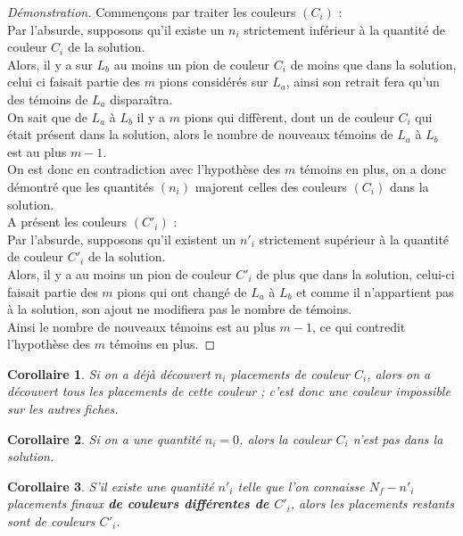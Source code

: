 \documentclass[]{article}
\newtheorem{mycoro}{Corollaire}
\begin{document}
\begin{proof}[Démonstration]
	Commençons par traiter les couleurs $(C_i)$ :
	\\
	Par l'absurde, supposons qu'il existe un $n_i$ strictement inférieur à la quantité de couleur $C_i$ de la solution.
	\\
	Alors, il y a sur $L_b$ au moins un pion de couleur $C_i$ de moins que dans la solution, celui ci faisait partie des $m$ pions considérés sur $L_a$, ainsi son retrait fera qu'un des témoins de $L_a$ disparaîtra.
	\\
	On sait que de $L_a$ à $L_b$ il y a $m$ pions qui diffèrent, dont un de couleur $C_i$ qui était présent dans la solution, alors le nombre de nouveaux témoins de $L_a$ à $L_b$ est au plus $m - 1$.
	\\
	On est donc en contradiction avec l'hypothèse des $m$ témoins en plus, on a donc démontré que les quantités $(n_i)$ majorent celles des couleurs $(C_i)$ dans la solution.
	\\
	A présent les couleurs $(C'_i)$ :
	\\
	Par l'absurde, supposons qu'il existent un $n'_i$ strictement supérieur à la quantité de couleur $C'_i$ de la solution.
	\\
	Alors, il y a au moins un pion de couleur $C'_i$ de plus que dans la solution, celui-ci faisait partie des $m$ pions qui ont changé de $L_a$ à $L_b$ et comme il n'appartient pas à la solution, son ajout ne modifiera pas le nombre de témoins.
	\\
	Ainsi le nombre de nouveaux témoins est au plus $m-1$, ce qui contredit l'hypothèse des $m$ témoins en plus.
\end{proof}

\begin{mycoro}
Si on a déjà découvert $n_i$ placements de couleur $C_i$, alors on a découvert tous les placements de cette couleur ; c'est donc une couleur impossible sur les autres fiches.
\end{mycoro}

\begin{mycoro}
Si on a une quantité $n_i=0$, alors la couleur $C_i$ n'est pas dans la solution.
\end{mycoro}

\begin{mycoro}
S'il existe une quantité $n'_i$ telle que l'on connaisse $N_f - n'_i$ placements finaux \textbf{de couleurs différentes de $C'_i$}, alors les placements restants sont de couleurs $C'_i$.
\end{mycoro}
\end{document}
